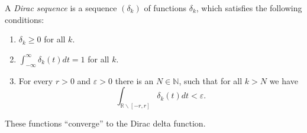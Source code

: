 \documentclass[12pt]{article}
\begin{document}
A \emph{Dirac sequence} is a sequence $(\delta_k)$ of functions $\delta_k$, which satisfies the following conditions:
\begin{enumerate}
\item $\delta_k\geq0$ for all $k$.\\
\item $\int_{-\infty}^\infty\delta_k(t)dt=1$ for all $k$.\\
\item For every $r>0$ and $\varepsilon>0$ there is an $N\in\mathbb{N}$, such that for all $k>N$ we have
$$\int_{\mathbb{R}\backslash[-r,r]}\delta_k(t)dt<\varepsilon.$$
\end{enumerate}
These functions ``converge'' to the Dirac delta function.
\end{document}
